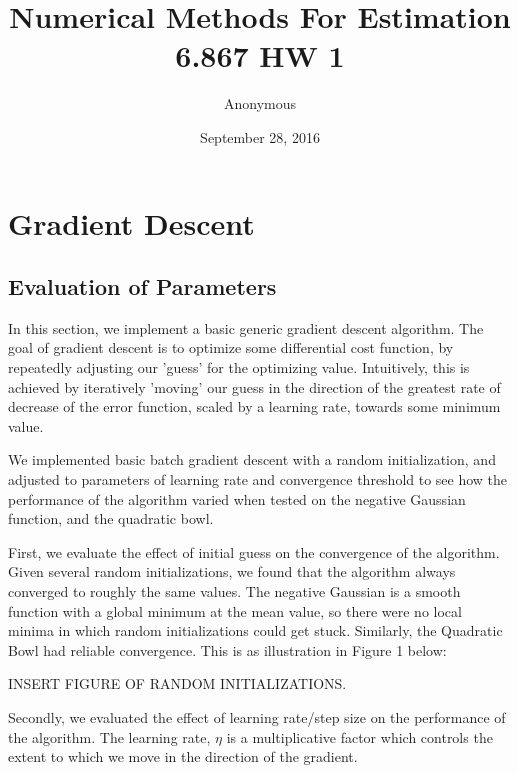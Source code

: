 \documentclass[11pt]{article}
\newcommand{\?}[0]{\vert}
\begin{document}
\title{Numerical Methods For Estimation\\
	6.867 HW 1}

\author{Anonymous}


\date{September 28, 2016}

\maketitle


\section{Gradient Descent}

\subsection{Evaluation of Parameters}

In this section, we implement a basic generic gradient descent algorithm. The goal of gradient descent is to optimize some differential cost function, by repeatedly adjusting our 'guess' for the optimizing value. Intuitively, this is achieved by iteratively 'moving' our guess in the direction of the greatest rate of decrease of the error function, scaled by a learning rate, towards some minimum value.


We implemented basic batch gradient descent with a random initialization, and adjusted to parameters of learning rate and convergence threshold to see how the performance of the algorithm varied when tested on the negative Gaussian function, and the quadratic bowl.

First, we evaluate the effect of initial guess on the convergence of the algorithm. Given several random initializations, we found that the algorithm always converged to roughly the same values. The negative Gaussian is a smooth function with a global minimum at the mean value, so there were no local minima in which random initializations could get stuck. Similarly, the Quadratic Bowl had reliable convergence.
This is as illustration in Figure 1 below:

INSERT FIGURE OF RANDOM INITIALIZATIONS.

Secondly, we evaluated the effect of learning rate/step size on the performance of the algorithm. The learning rate, $\eta$ is a multiplicative factor which controls the extent to which we move in the direction of the gradient.
\end{document}
